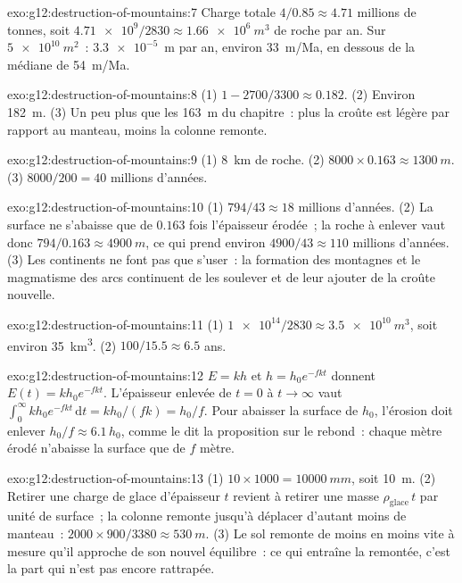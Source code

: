 \begin{solution}{exo:g12:destruction-of-mountains:7}
Charge totale $4/0.85 \approx 4.71$ millions de tonnes, soit $\num{4.71e9}/2830 \approx
\qty{1.66e6}{m^3}$ de roche par an. Sur $\qty{5e10}{m^2}$~: $\num{3.3e-5}$~m
par an, environ \qty{33}{m/Ma}, en dessous de la médiane de
\qty{54}{m/Ma}.
\end{solution}

\begin{solution}{exo:g12:destruction-of-mountains:8}
(1) $1 - 2700/3300 \approx 0.182$. (2) Environ \qty{182}{m}. (3) Un peu
plus que les \qty{163}{m} du chapitre~: plus la croûte est légère par
rapport au manteau, moins la colonne remonte.
\end{solution}

\begin{solution}{exo:g12:destruction-of-mountains:9}
(1) \qty{8}{km} de roche. (2) $8000 \times 0.163 \approx \qty{1300}{m}$.
(3) $8000/200 = 40$ millions d'années.
\end{solution}

\begin{solution}{exo:g12:destruction-of-mountains:10}
(1) $794/43 \approx 18$ millions d'années. (2) La surface ne s'abaisse que
de $0.163$ fois l'épaisseur érodée~; la roche à enlever vaut donc $794/0.163
\approx \qty{4900}{m}$, ce qui prend environ $4900/43 \approx 110$ millions
d'années. (3) Les continents ne font pas que s'user~: la formation des
montagnes et le magmatisme des arcs continuent de les soulever et de leur
ajouter de la croûte nouvelle.
\end{solution}

\begin{solution}{exo:g12:destruction-of-mountains:11}
(1) $\num{1e14}/2830 \approx \qty{3.5e10}{m^3}$, soit environ
\qty{35}{km^3}. (2) $100/15.5 \approx 6.5$ ans.
\end{solution}

\begin{solution}{exo:g12:destruction-of-mountains:12}
$E = kh$ et $h = h_0 e^{-fkt}$ donnent $E(t) = kh_0 e^{-fkt}$. L'épaisseur
enlevée de $t = 0$ à $t \to \infty$ vaut $\int_0^{\infty} kh_0
e^{-fkt}\,\mathrm{d}t = kh_0/(fk) = h_0/f$. Pour abaisser la surface de
$h_0$, l'érosion doit enlever $h_0/f \approx 6.1\,h_0$, comme le dit la
proposition sur le rebond~: chaque mètre érodé n'abaisse la surface que de
$f$ mètre.
\end{solution}

\begin{solution}{exo:g12:destruction-of-mountains:13}
(1) $10 \times 1000 = \qty{10000}{mm}$, soit \qty{10}{m}. (2) Retirer une
charge de glace d'épaisseur $t$ revient à retirer une masse $\rho_{\text{glace}}\,t$
par unité de surface~; la colonne remonte jusqu'à déplacer d'autant moins
de manteau~: $2000 \times 900/3380 \approx \qty{530}{m}$. (3) Le sol
remonte de moins en moins vite à mesure qu'il approche de son nouvel
équilibre~: ce qui entraîne la remontée, c'est la part qui n'est pas encore
rattrapée.
\end{solution}

